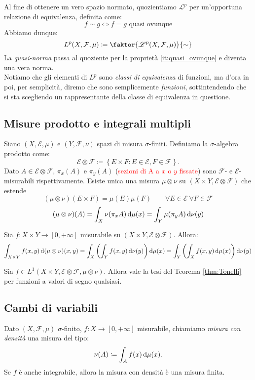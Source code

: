 Al fine di ottenere un vero spazio normato, quozientiamo $ \mathscr{L}^p $ per un'opportuna relazione di equivalenza, definita come:
\[ f \sim g \iff f = g \text{ quasi ovunque} \]
Abbiamo dunque:
\[ L^p(X,\mathcal{F},\mu) \coloneqq \faktor{\mathscr{L}^p(X,\mathcal{F},\mu)}{\sim} \]
La \emph{quasi-norma} passa al quoziente per la proprietà \eqref{it:quasi_ovunque} e diventa una vera norma. \\

Notiamo che gli elementi di $ L^p $ sono \emph{classi di equivalenza} di funzioni, ma d'ora in poi, per semplicità, diremo che sono semplicemente \emph{funzioni}, sottintendendo che si sta scegliendo un rappresentante della classe di equivalenza in questione.

\subsection{Misure prodotto e integrali multipli}
Siano $ (X,\mathcal{E},\mu) $ e $ (Y,\mathcal{F},\nu) $ spazi di misura $ \sigma $-finiti. Definiamo la $ \sigma $-algebra prodotto come:
\[ 
\mathcal{E} \otimes \mathcal{F} \coloneqq \left\{ E\times F : E \in \mathcal{E}, F \in \mathcal{F} \right\}. 
\]
Dato $ A \in \mathcal{E}\otimes\mathcal{F} $, $ \pi_x(A) $ e $ \pi_y(A) $ (\textcolor{red}{sezioni di A a $ x $ o $ y $ fissate}) sono $ \mathcal{F} $- e $ \mathcal{E} $-misurabili rispettivamente.
Esiste unica una misura $ \mu\otimes\nu $ su $ (X\times Y, \mathcal{E}\otimes\mathcal{F}) $ che estende
\[ 
(\mu\otimes\nu)(E\times F) = \mu(E)\mu(F) \qquad \forall E\in\mathcal{E}\ \forall F\in\mathcal{F} 
\]
\[
(\mu\otimes\nu)(A) = \int_X \nu(\pi_x A)\dif\mu(x) = \int_Y \mu(\pi_y A)\dif\nu(y) 
\]

\begin{thm}[Tonelli]\label{thm:Tonelli}
    Sia $ f\colon X\times Y \to [0,+\infty] $ misurabile su $ (X\times Y,\mathcal{E}\otimes\mathcal{F}) $. Allora:
    \[ \int_{X\times Y} f(x,y)\dif{(\mu\otimes\nu)}(x,y) = \int_X \left( \int_Y f(x,y) \dif\nu(y) \right) \dif\mu(x) = \int_Y \left( \int_X f(x,y) \dif\mu(x) \right) \dif\nu(y) \]
\end{thm}

\begin{thm}[Fubini]
    Sia $ f \in L^1(X\times Y,\mathcal{E}\otimes\mathcal{F},\mu\otimes\nu) $. Allora vale la tesi del Teorema \ref{thm:Tonelli} per funzioni a valori di segno qualsiasi.
\end{thm}

\subsection{Cambi di variabili}
Dato $ (X,\mathcal{F},\mu) $ $ \sigma $-finito, $ f\colon X\to[0,+\infty] $ misurabile, chiamiamo \emph{misura con densità} una misura del tipo:
\[ \nu(A) \coloneqq \int_A f(x)\dif\mu(x). \]
Se $ f $ è anche integrabile, allora la misura con densità è una misura finita.

